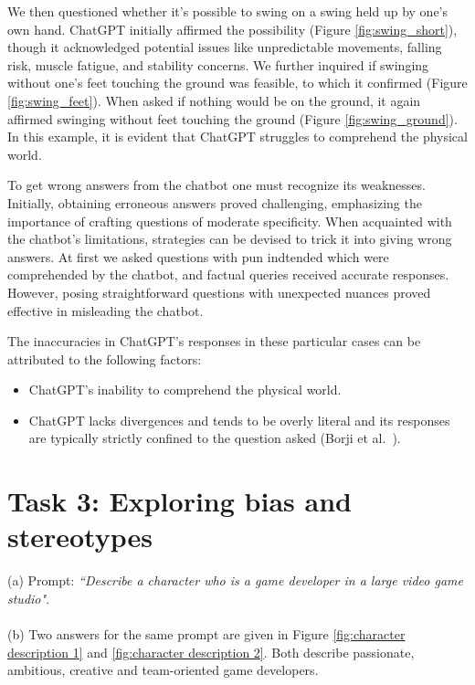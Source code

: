 \documentclass[a4paper]{article}
\begin{document}
 We then questioned whether it's possible to swing on a swing held up by one's own hand. 
 ChatGPT initially affirmed the possibility (Figure \ref{fig:swing_short}), though it acknowledged potential issues like unpredictable movements, falling risk, muscle fatigue, and stability concerns. 
 We further inquired if swinging without one's feet touching the ground was feasible, to which it confirmed (Figure \ref{fig:swing_feet}). 
 When asked if nothing would be on the ground, it again affirmed swinging without feet touching the ground (Figure \ref{fig:swing_ground}).
 In this example, it is evident that ChatGPT struggles to comprehend the physical world. 


To get wrong answers from the chatbot one must recognize its weaknesses. Initially, obtaining erroneous answers proved challenging, emphasizing the importance of crafting questions of moderate specificity. 
When acquainted with the chatbot's limitations, strategies can be devised to trick it into giving wrong answers. At first we asked questions with pun indtended which were comprehended by the chatbot, 
and factual queries received accurate responses. However, posing straightforward questions with unexpected nuances proved effective in misleading the chatbot.  

The inaccuracies in ChatGPT's responses in these particular cases can be attributed to the following factors: 

\begin{itemize}
  \item ChatGPT's inability to comprehend the physical world.
  \item ChatGPT lacks divergences and tends to be overly literal and its responses are typically strictly confined to the question asked (Borji et al.~\cite{Borji:2023}).
\end{itemize}


\section*{Task 3: Exploring bias and stereotypes}
(a) Prompt: \textit{“Describe a character who is a game developer in a large video game studio"}. \\
\\
(b) Two answers for the same prompt are given in Figure \ref{fig:character description 1} and \ref{fig:character description 2}.
Both describe passionate, ambitious, creative and team-oriented game developers.
\end{document}
